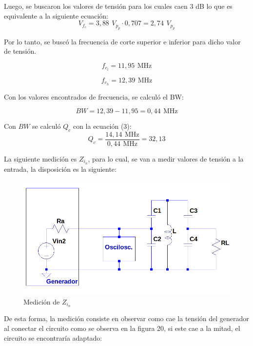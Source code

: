Luego, se buscaron los valores de tensión para los cuales caen 3 dB lo que es equivalente a la siguiente ecuación:
\begin{equation}
    V_f_c = 3,88 \,\ V_p_p \cdot 0,707 = 2,74 \,\ V_p_p
\end{equation}

Por lo tanto, se buscó la frecuencia de corte superior e inferior para dicho valor de tensión.

\begin{equation}
    f_c_l = 11,95 \,\ \text{MHz}
\end{equation}

\begin{equation}
    f_c_h = 12,39 \,\ \text{MHz}
\end{equation}

Con los valores encontrados de frecuencia, se calculó el BW:

\begin{equation}
BW = 12,39 - 11,95 = \boxed{0,44 \,\ \text{MHz}}
\end{equation}

Con \(BW\) se calculó \(Q_c\) con la ecuación (3):
\begin{equation}
    Q_c= \frac{14,14 \,\ \text{MHz}}{0,44 \,\ \text{MHz}} = \boxed{32,13}
\end{equation}

\newpage
La siguiente medición es \(Z_i_n\), para lo cual, se van a medir valores de tensión a la entrada, la disposición es la siguiente:

\begin{figure}[!h]
    \centering
    \includegraphics[scale=0.4]{Imagenes/ZIN.png}
    \caption{Medición de \(Z_i_n\)}
    \label{fig:Zin}
\end{figure}

De esta forma, la medición consiste en observar como cae la tensión del generador al conectar el circuito como se observa en la figura 20, si este cae a la mitad, el circuito se encontraría adaptado:

